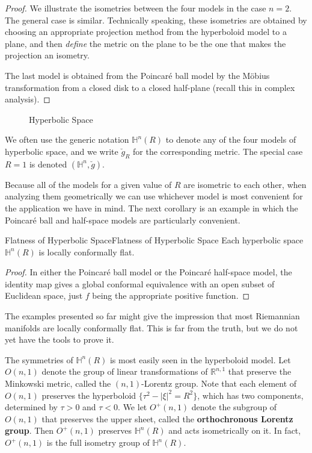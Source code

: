 \documentclass[../main.tex]{subfiles}
\begin{document}
\begin{proof}
	We illustrate the isometries between the four models in the case $n=2$. The general case is similar. Technically speaking, these isometries are obtained by choosing an appropriate projection method from the hyperboloid model to a plane, and then \emph{define} the metric on the plane to be the one that makes the projection an isometry.

	The last model is obtained from the Poincaré ball model by the Möbius transformation from a closed disk to a closed half-plane (recall this in complex analysis).
\end{proof}

\begin{figure}[ht]
	\centering
	\caption{Hyperbolic Space}
	\label{fig:hyperbolic-space}
\end{figure}

We often use the generic notation $\mathbb{H}^n(R)$ to denote any of the four models of hyperbolic space, and we write $\breve{g}_R$ for the corresponding metric. The special case $R=1$ is denoted $(\mathbb{H}^n, \breve{g})$.

Because all of the models for a given value of $R$ are isometric to each other, when analyzing them geometrically we can use whichever model is most convenient for the application we have in mind. The next corollary is an example in which the Poincaré ball and half-space models are particularly convenient.

\begin{corollary}{Flatness of Hyperbolic Space}{Flatness of Hyperbolic Space}
  Each hyperbolic space $\mathbb{H}^n(R)$ is locally conformally flat.
\end{corollary}
\begin{proof}
  In either the Poincaré ball model or the Poincaré half-space model, the identity map gives a global conformal equivalence with an open subset of Euclidean space, just $f$ being the appropriate positive function.
\end{proof}

\begin{remark}
  The examples presented so far might give the impression that most Riemannian manifolds are locally conformally flat. This is far from the truth, but we do not yet have the tools to prove it.
\end{remark}

The symmetries of $\mathbb{H}^n(R)$ is most easily seen in the hyperboloid model. Let $O(n,1)$ denote the group of linear transformations of $\mathbb{R}^{n,1}$ that preserve the Minkowski metric, called the $(n,1)$-Lorentz group. Note that each element of $O(n,1)$ preserves the hyperboloid $\{\tau^2 - |\xi|^2 = R^2\}$, which has two components, determined by $\tau > 0$ and $\tau < 0$. We let $O^+(n,1)$ denote the subgroup of $O(n,1)$ that preserves the upper sheet, called the \textbf{orthochronous Lorentz group}. Then $O^+(n,1)$ preserves $\mathbb{H}^n(R)$ and acts isometrically on it. In fact, $O^+(n,1)$ is the full isometry group of $\mathbb{H}^n(R)$.
\end{document}
